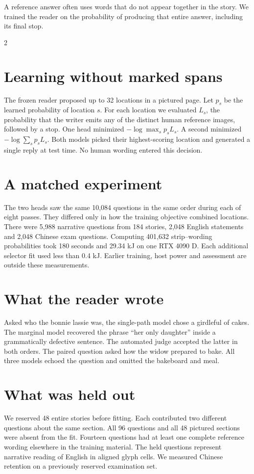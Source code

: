 \noindent A reference answer often uses words that do not appear together in the story. We trained the reader on the probability of producing that entire answer, including its final stop.
\begin{multicols}{2}
\section*{Learning without marked spans}
The frozen reader proposed up to 32 locations in a pictured page. Let $p_s$ be the learned probability of location $s$. For each location we evaluated $L_s$, the probability that the writer emits any of the distinct human reference images, followed by a stop. One head minimized $-\log\max_s p_s L_s$. A second minimized $-\log\sum_s p_s L_s$. Both models picked their highest-scoring location and generated a single reply at test time. No human wording entered this decision.
\section*{A matched experiment}
The two heads saw the same 10,084 questions in the same order during each of eight passes. They differed only in how the training objective combined locations. There were 5,988 narrative questions from 184 stories, 2,048 English statements and 2,048 Chinese exam questions. Computing 401,632 strip--wording probabilities took 180 seconds and 29.34 kJ on one RTX 4090 D. Each additional selector fit used less than 0.4 kJ. Earlier training, host power and assessment are outside these measurements.
\section*{What the reader wrote}
Asked who the bonnie lassie was, the single-path model chose a girdleful of cakes. The marginal model recovered the phrase “her only daughter” inside a grammatically defective sentence. The automated judge accepted the latter in both orders. The paired question asked how the widow prepared to bake. All three models echoed the question and omitted the bakeboard and meal.
\section*{What was held out}
We reserved 48 entire stories before fitting. Each contributed two different questions about the same section. All 96 questions and all 48 pictured sections were absent from the fit. Fourteen questions had at least one complete reference wording elsewhere in the training material. The held questions represent narrative reading of English in aligned glyph cells. We measured Chinese retention on a previously reserved examination set.
\end{multicols}
